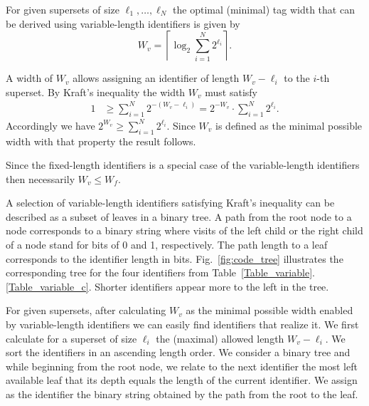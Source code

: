 \begin{property}
For given supersets of size $\ell_1, \ldots, \ell_N$ the optimal (minimal) tag width that can be derived using variable-length identifiers is given by 
\begin{equation} \label{eq2}
W_{v}  = \left \lceil \log_2 \sum_{i = 1}^{N}{2^{\ell_i}} \right \rceil. \nonumber 
\end{equation}
\label{property_variable_length_minimal_tag}
\end{property} 
\bp
A width of $W_{v}$ allows assigning an identifier of length  $W_{v} - \ell_i$ to the $i$-th superset. By Kraft's inequality the width  $W_{v}$ must satisfy
\begin{equation} \label{eq1}
\begin{split}
1 &\ge \sum_{i = 1}^{N}{2^{-(W_{v}-\ell_i)}} = 2^{-W_{v}} \cdot \sum_{i = 1}^{N}{2^{\ell_i}}. \nonumber 
\end{split}
\end{equation}
Accordingly we have $2^{W_{v}}  \ge \sum_{i = 1}^{N}{2^{\ell_i}}$. Since $W_{v}$ is defined as the minimal possible width with that property the result follows.
\ep

 
Since the fixed-length identifiers is a special case of the variable-length identifiers then necessarily $W_{v} \le W_{f}$. 

A selection of variable-length identifiers satisfying Kraft's inequality can be described as a subset of leaves in a binary tree. 
A path from the root node to a node corresponds to a binary string where visits of the left child or the right child of a node stand for bits of 0 and 1, respectively. 
The path length  to a leaf corresponds to the identifier length in bits.
Fig.~\ref{fig:code_tree} illustrates the corresponding tree for the four identifiers from Table~\ref{Table_variable}.\ref{Table_variable_c}. 
Shorter identifiers appear more to the left in the tree.

For given supersets, after calculating $W_{v}$ as the minimal possible width enabled by variable-length identifiers we can easily find identifiers that realize it. We first calculate for a superset of size $\ell_i$ the (maximal) allowed length $W_{v} - \ell_i$. We sort the identifiers in an ascending length order. We consider a binary tree and while beginning from the root node, we relate to the next identifier the most left available leaf that its depth equals the length of the current identifier. We assign as the identifier the binary string obtained by the path from the root to the leaf.
 
